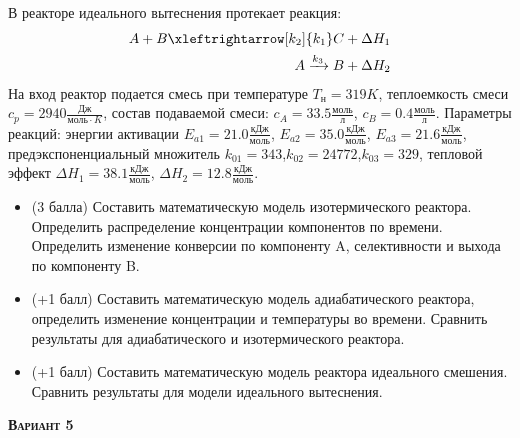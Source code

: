  В реакторе идеального вытеснения протекает реакция: \begin{equation*} \begin{aligned} A+B \xleftrightarrow[k_2]{k_1} C +\Delta H_1 \\ A \xrightarrow{k_3} B + \Delta H_2 \end{aligned} \end{equation*}                                     На вход  реактор подается смесь при температуре $ T_н =  319 K$, теплоемкость смеси $c_p= 2940 \frac{Дж}{моль \cdot K}$, состав подаваемой смеси: $c_A=33.5 \frac{моль}{л}$, $c_B=0.4 \frac{моль}{л}$. Параметры реакций: энергии активации $E_{a1}=21.0 \frac{кДж}{моль}$, $E_{a2}=35.0  \frac{кДж}{моль}$, $E_{a3}=21.6  \frac{кДж}{моль}$, предэкспоненциальный множитель $k_{01}=       343$,$k_{02}=     24772$,$k_{03}=       329$, тепловой эффект $\Delta H_1= 38.1  \frac{кДж}{моль}$, $\Delta H_2=12.8 \frac{кДж}{моль}$.\begin{itemize} \item (3 балла) Составить математическую модель изотермического реактора. Определить распределение концентрации компонентов по времени. Определить изменение конверсии по компоненту A, селективности и выхода по компоненту B. \item (+1 балл) Составить математическую модель адиабатического реактора, определить изменение концентрации и температуры во времени. Сравнить результаты для адиабатического и изотермического реактора. \item (+1 балл) Составить математическую модель реактора идеального смешения. Сравнить результаты для модели идеального вытеснения. \end{itemize}

\textsc{\textbf{Вариант 5}}

